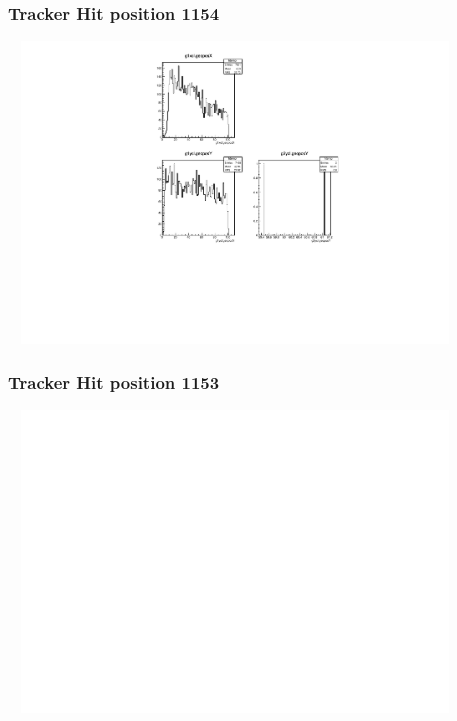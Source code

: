 \documentclass[slidestop,compress,mathserif]{beamer}
\begin{document}
\begin{frame}\frametitle{Tracker Hit position 1154}
	 \includegraphics[width=12cm,height=8cm]{Tracker_Hit_position_1154.pdf}
\end{frame}
\begin{frame}\frametitle{Tracker Hit position 1153}
	 \includegraphics[width=12cm,height=8cm]{Tracker_Hit_position_1153.pdf}
\end{frame}
\end{document}
